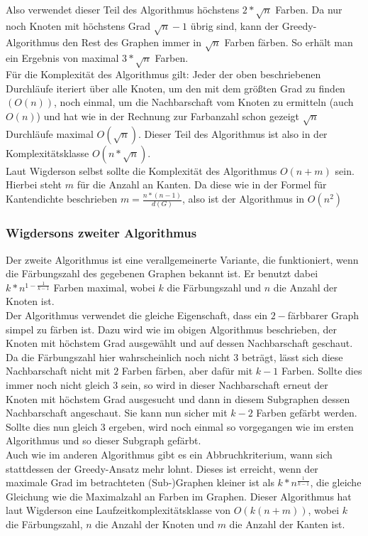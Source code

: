 \documentclass[11pt]{article}
\begin{document}
Also verwendet dieser Teil des Algorithmus höchstens $2*\sqrt{n}$ Farben. Da nur noch Knoten mit höchstens Grad $\sqrt{n}-1$ übrig sind, kann der Greedy-Algorithmus
den Rest des Graphen immer in $\sqrt{n}$ Farben färben. So erhält man ein Ergebnis von maximal $3*\sqrt{n}$ Farben. \\
Für die Komplexität des Algorithmus gilt: Jeder der oben beschriebenen Durchläufe iteriert über alle Knoten, um den mit dem größten Grad zu finden $(O(n))$,
noch einmal, um die Nachbarschaft vom Knoten zu ermitteln (auch  $O(n)$) %
und hat wie in der Rechnung zur Farbanzahl schon gezeigt $\sqrt{n}$ Durchläufe maximal $O(\sqrt{n})$.
Dieser Teil des Algorithmus ist also in der Komplexitätsklasse $O(n*\sqrt{n})$. \\
Laut Wigderson selbst sollte die Komplexität des Algorithmus $O(n+m)$ sein. Hierbei steht $m$ für die Anzahl an Kanten. Da diese wie in der Formel für Kantendichte beschrieben $m = \frac{n*(n-1)}{d(G)}$, also ist der Algorithmus in $O(n^2)$ \\

\subsubsection{Wigdersons zweiter Algorithmus}

Der zweite Algorithmus ist eine verallgemeinerte Variante, die funktioniert, wenn die Färbungszahl des gegebenen Graphen bekannt ist.
Er benutzt dabei $k*n^{1-\frac{1}{k-1}}$ Farben maximal, wobei $k$ die Färbungszahl und $n$ die Anzahl der Knoten ist. \\
Der Algorithmus verwendet die gleiche Eigenschaft, dass ein $2-$färbbarer Graph simpel zu färben ist.
Dazu wird wie im obigen Algorithmus beschrieben, der Knoten mit höchstem Grad ausgewählt und auf dessen Nachbarschaft geschaut. 
Da die Färbungszahl hier wahrscheinlich noch nicht $3$ beträgt, lässt sich diese Nachbarschaft nicht mit $2$ Farben färben, aber dafür mit $k-1$ Farben. 
Sollte dies immer noch nicht gleich $3$ sein, so wird in dieser Nachbarschaft erneut der Knoten mit höchstem Grad ausgesucht und dann in diesem Subgraphen dessen Nachbarschaft angeschaut. 
Sie kann nun sicher mit $k-2$ Farben gefärbt werden. Sollte dies nun gleich $3$ ergeben, wird noch einmal so vorgegangen wie im ersten Algorithmus und so dieser Subgraph gefärbt. \\
Auch wie im anderen Algorithmus gibt es ein Abbruchkriterium, wann sich stattdessen der Greedy-Ansatz mehr lohnt. Dieses ist erreicht, wenn der maximale Grad im betrachteten (Sub-)Graphen kleiner ist als $k*n^{\frac{1}{k-1}}$, die gleiche Gleichung wie die Maximalzahl an Farben im Graphen.
Dieser Algorithmus hat laut Wigderson eine Laufzeitkomplexitätsklasse von $O(k(n+m))$, wobei $k$ die Färbungszahl, $n$ die Anzahl der Knoten und $m$ die Anzahl der Kanten ist.
\end{document}
